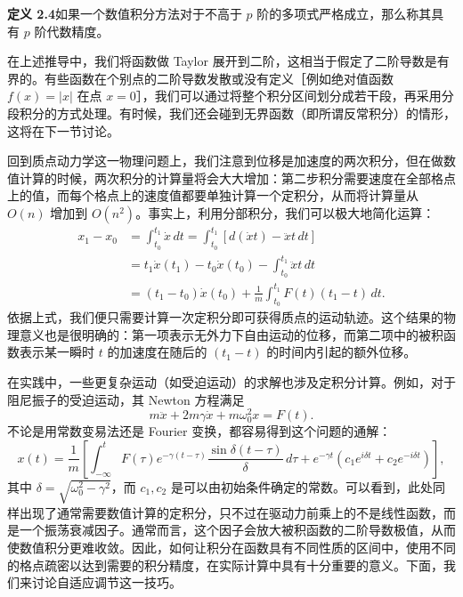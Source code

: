 \textbf{定义 2.4}\quad 如果一个数值积分方法对于不高于 $p$ 阶的多项式严格成立，那么称其具有 $p$ 阶代数精度。

在上述推导中，我们将函数做 Taylor 展开到二阶，这相当于假定了二阶导数是有界的。有些函数在个别点的二阶导数发散或没有定义［例如绝对值函数 $f(x)=|x|$ 在点 $x=0$］，我们可以通过将整个积分区间划分成若干段，再采用分段积分的方式处理。有时候，我们还会碰到无界函数（即所谓反常积分）的情形，这将在下一节讨论。

回到质点动力学这一物理问题上，我们注意到位移是加速度的两次积分，但在做数值计算的时候，两次积分的计算量将会大大增加：第二步积分需要速度在全部格点上的值，而每个格点上的速度值都要单独计算一个定积分，从而将计算量从 $O(n)$ 增加到 $O(n^2)$。事实上，利用分部积分，我们可以极大地简化运算：
\begin{equation}
\begin{aligned}
x_1-x_0&=\int_{t_0}^{t_1}\dot{x}\,dt
=\int_{t_0}^{t_1}[d(\dot{x}t)-\ddot{x}t\,dt]\\
&=t_1\dot{x}(t_1)-t_0\dot{x}(t_0)-\int_{t_0}^{t_1}\ddot{x}t\,dt\\
&=(t_1-t_0)\dot{x}(t_0)+\frac1m\int_{t_0}^{t_1}F(t)(t_1-t)\,dt.
\end{aligned}
\tag{2.2.4}
\end{equation}
依据上式，我们便只需要计算一次定积分即可获得质点的运动轨迹。这个结果的物理意义也是很明确的：第一项表示无外力下自由运动的位移，而第二项中的被积函数表示某一瞬时 $t$ 的加速度在随后的 $(t_1-t)$ 的时间内引起的额外位移。

在实践中，一些更复杂运动（如受迫运动）的求解也涉及定积分计算。例如，对于阻尼振子的受迫运动，其 Newton 方程满足
\begin{equation}
m\ddot{x}+2m\gamma\dot{x}+m\omega_0^2x=F(t).
\tag{2.2.5}
\end{equation}
不论是用常数变易法还是 Fourier 变换，都容易得到这个问题的通解：
\begin{equation}
x(t)=\frac1m\left[\int_{-\infty}^{t}F(\tau)e^{-\gamma(t-\tau)}\frac{\sin\delta(t-\tau)}{\delta}\,d\tau
+e^{-\gamma t}(c_1e^{i\delta t}+c_2e^{-i\delta t})\right],
\tag{2.2.6}
\end{equation}
其中 $\delta=\sqrt{\omega_0^2-\gamma^2}$，而 $c_1,c_2$ 是可以由初始条件确定的常数。可以看到，此处同样出现了通常需要数值计算的定积分，只不过在驱动力前乘上的不是线性函数，而是一个振荡衰减因子。通常而言，这个因子会放大被积函数的二阶导数极值，从而使数值积分更难收敛。因此，如何让积分在函数具有不同性质的区间中，使用不同的格点疏密以达到需要的积分精度，在实际计算中具有十分重要的意义。下面，我们来讨论自适应调节这一技巧。

